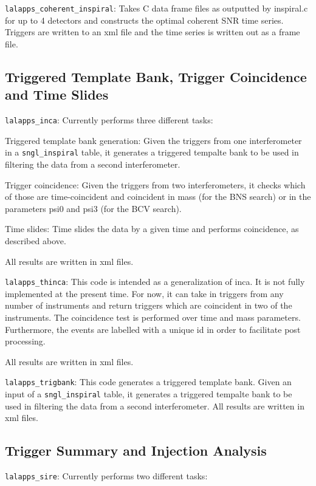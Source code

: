 \texttt{lalapps\_coherent\_inspiral}: Takes C data frame files as 
outputted by inspiral.c for up to 4 detectors and constructs the optimal 
coherent SNR time series.  Triggers are written to an xml file and the time 
series is written out as a frame file.

\subsection{Triggered Template Bank, Trigger Coincidence and Time Slides}

\texttt{lalapps\_inca}: Currently performs three different tasks:

Triggered template bank generation: Given the triggers from one interferometer
in a \verb$sngl_inspiral$ table, it generates a triggered tempalte bank to be
used in filtering the data from a second interferometer. 

Trigger coincidence: Given the triggers from two interferometers, it checks
which of those are time-coincident and coincident in mass (for the BNS search)
or in the parameters psi0 and psi3 (for the BCV search).

Time slides: Time slides the data by a given time and performs coincidence,
as described above.

All results are written in xml files.

\texttt{lalapps\_thinca}: This code is intended as a generalization of inca.  It
is not fully implemented at the present time.  For now, it can take in triggers
from any number of instruments and return triggers which are coincident in two
of the instruments.  The coincidence test is performed over time and mass
parameters.  Furthermore, the events are labelled with a unique id in order to
facilitate post processing.  

All results are written in xml files.

\texttt{lalapps\_trigbank}:  This code generates a triggered template bank.
Given an input of a \verb$sngl_inspiral$ table, it generates a triggered
tempalte bank to be used in filtering the data from a second interferometer. 
All results are written in xml files.

\subsection{Trigger Summary and Injection Analysis}

\texttt{lalapps\_sire}: Currently performs two different tasks:

